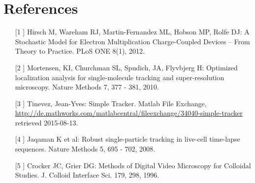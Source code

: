 \section{References}
\begin{itemize}
\item[[1]]  Hirsch M, Wareham RJ, Martin-Fernandez ML, Hobson MP, Rolfe DJ: A Stochastic Model for Electron Multiplication Charge-Coupled Devices – From Theory to Practice. PLoS ONE 8(1), 2012.
\item[[2]] Mortensen, KI, Churchman SL, Spudich, JA, Flyvbjerg H: Optimized localization analysis for single-molecule tracking and super-resolution microscopy. Nature Methods 7, 377 - 381, 2010.
\item [[3]] Tinevez, Jean-Yves: Simple Tracker. Matlab File Exchange, \url{http://de.mathworks.com/matlabcentral/fileexchange/34040-simple-tracker} retrieved 2015-08-13.
\item [[4]] Jaqaman K et al: Robust single-particle tracking in live-cell time-lapse sequences. Nature Methods 5, 695 - 702, 2008.
\item [[5]] Crocker JC, Grier DG: Methods of Digital Video Microscopy for Colloidal Studies. J. Colloid Interface Sci. 179, 298, 1996. 
\end{itemize}





















































